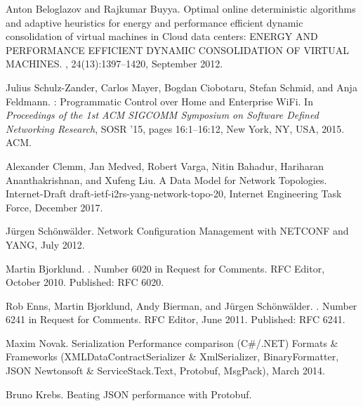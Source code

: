 \begin{thebibliography}{100}
 Anton Beloglazov and Rajkumar Buyya.
\newblock Optimal online deterministic algorithms and adaptive heuristics for
  energy and performance efficient dynamic consolidation of virtual machines in
  {Cloud} data centers: {ENERGY} {AND} {PERFORMANCE} {EFFICIENT} {DYNAMIC}
  {CONSOLIDATION} {OF} {VIRTUAL} {MACHINES}.
,
  24(13):1397--1420, September 2012.

 Julius Schulz-Zander, Carlos Mayer, Bogdan Ciobotaru, Stefan Schmid, and Anja
  Feldmann.
: {Programmatic} {Control} over {Home} and {Enterprise}
  {WiFi}.
\newblock In {\em Proceedings of the 1st {ACM} {SIGCOMM} {Symposium} on
  {Software} {Defined} {Networking} {Research}}, {SOSR} '15, pages 16:1--16:12,
  New York, NY, USA, 2015. ACM.

 Alexander Clemm, Jan Medved, Robert Varga, Nitin Bahadur, Hariharan
  Ananthakrishnan, and Xufeng Liu.
\newblock A {Data} {Model} for {Network} {Topologies}.
\newblock Internet-{Draft} draft-ietf-i2rs-yang-network-topo-20, Internet
  Engineering Task Force, December 2017.

 {J{\"u}rgen Sch{\"o}nw{\"a}lder}.
\newblock Network {Configuration} {Management} with {NETCONF} and {YANG}, July
  2012.

 Martin Bjorklund.
.
\newblock Number 6020 in Request for {Comments}. RFC Editor, October 2010.
\newblock Published: RFC 6020.

 Rob Enns, Martin Bjorklund, Andy Bierman, and J{\"u}rgen Sch{\"o}nw{\"a}lder.
.
\newblock Number 6241 in Request for {Comments}. RFC Editor, June 2011.
\newblock Published: RFC 6241.

 {Maxim Novak}.
\newblock Serialization {Performance} comparison ({C}\#/.{NET}) {\textendash}
  {Formats} \& {Frameworks} ({XML}{\textendash}{DataContractSerializer} \&
  {XmlSerializer}, {BinaryFormatter}, {JSON}{\textendash} {Newtonsoft} \&
  {ServiceStack}.{Text}, {Protobuf}, {MsgPack}), March 2014.

 {Bruno Krebs}.
\newblock Beating {JSON} performance with {Protobuf}.


\end{thebibliography}
